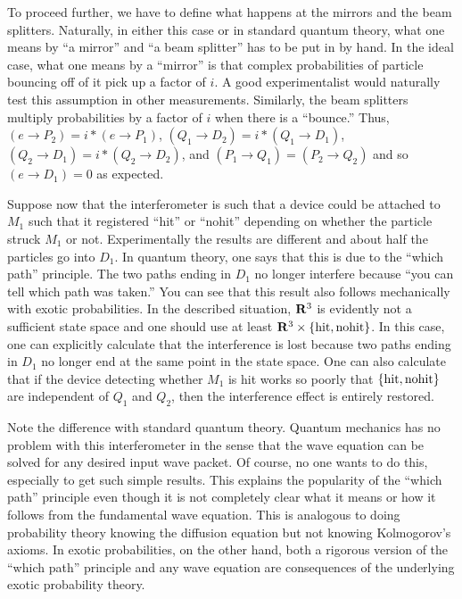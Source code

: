 \documentclass[12pt]{article}
\begin{document}
To proceed further, we have to define what happens at the mirrors and the beam 
splitters.  Naturally, in either this case or in standard quantum theory, what
one means by ``a mirror'' and ``a beam splitter'' has to be put in by hand.  
In the ideal case, what one means by a ``mirror'' is that complex probabilities
of particle bouncing off of it pick up a factor of $i$.  A good experimentalist would
naturally test this assumption in other measurements.  Similarly, the beam splitters
multiply probabilities by a factor of $i$ when there is a ``bounce.'' Thus, 
$(e\rightarrow P_2)=i*(e\rightarrow P_1)$,
$(Q_1\rightarrow D_2)=i*(Q_1\rightarrow D_1)$, $(Q_2\rightarrow D_1)=i*(Q_2\rightarrow D_2)$, 
and $(P_1\rightarrow Q_1)=(P_2\rightarrow Q_2)$ and so
$(e\rightarrow D_1)=0$ as expected.  

Suppose now that the interferometer is such that a device could be attached to 
$M_1$ such that it registered ``hit'' or ``nohit'' depending on whether the
particle struck $M_1$ or not.  Experimentally the results are different and about
half the particles go into $D_1$.
In quantum theory, one says that this is due to the ``which path'' principle.  The
two paths ending in $D_1$ no longer interfere because ``you can tell which path 
was taken.''
You can see that this result also follows mechanically with exotic probabilities.  
In the described situation,
${\bf R}^3$ is evidently not a sufficient state space and one
should use at least ${\bf R}^3\times\{{\rm hit},{\rm nohit}\}$.  In this case, one can
explicitly calculate that the 
interference is lost because two paths ending in $D_1$ no longer end at the same
point in the state space. One can also calculate that if the device detecting whether $M_1$ is hit
works so poorly that $\{{\rm hit},{\rm nohit}\}$ are independent of $Q_1$ and $Q_2$,
then the interference effect is entirely restored\cite{mpl2}.

Note the difference with standard quantum theory.
Quantum mechanics has no problem with this interferometer in the sense that  
the wave equation can be solved for any desired input wave packet.  Of course, 
no one wants to do this, especially to get such simple results.  This 
explains the popularity of the ``which path'' principle even though it is 
not completely clear what it means or how it follows from the fundamental 
wave equation.  This is analogous to doing probability theory knowing
the diffusion equation but not knowing Kolmogorov's axioms.
In exotic probabilities, on the other hand, both a rigorous version of 
the ``which path'' principle and any wave equation are consequences of the
underlying exotic probability theory.
\end{document}
